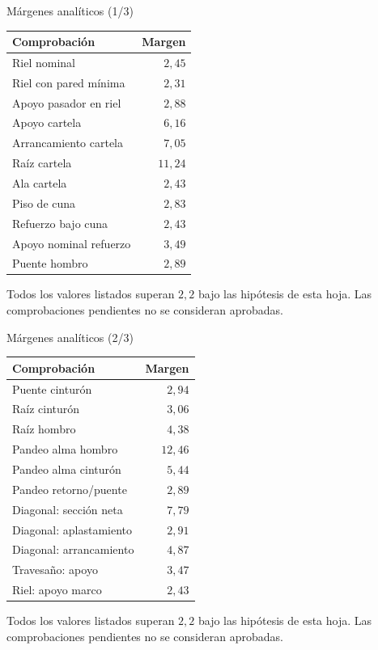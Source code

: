 \documentclass[10pt,aspectratio=169]{beamer}
\newcommand{\mcref}{Guía de diseño}
\begin{document}
\gdef\mcref{Mathcad: sección 24 / pág. 40-42}
\begin{frame}[t]{Márgenes analíticos (1/3)}
\small\begin{center}\begin{tabular}{lr}\toprule Comprobación & Margen\\\midrule Riel nominal & $2{,}45$\\
Riel con pared mínima & $2{,}31$\\
Apoyo pasador en riel & $2{,}88$\\
Apoyo cartela & $6{,}16$\\
Arrancamiento cartela & $7{,}05$\\
Raíz cartela & $11{,}24$\\
Ala cartela & $2{,}43$\\
Piso de cuna & $2{,}83$\\
Refuerzo bajo cuna & $2{,}43$\\
Apoyo nominal refuerzo & $3{,}49$\\
Puente hombro & $2{,}89$\\\bottomrule\end{tabular}\end{center} Todos los valores listados superan $2{,}2$ bajo las hipótesis de esta hoja. Las comprobaciones pendientes no se consideran aprobadas.
\end{frame}

\gdef\mcref{Mathcad: sección 24 / pág. 40-42}
\begin{frame}[t]{Márgenes analíticos (2/3)}
\small\begin{center}\begin{tabular}{lr}\toprule Comprobación & Margen\\\midrule Puente cinturón & $2{,}94$\\
Raíz cinturón & $3{,}06$\\
Raíz hombro & $4{,}38$\\
Pandeo alma hombro & $12{,}46$\\
Pandeo alma cinturón & $5{,}44$\\
Pandeo retorno/puente & $2{,}89$\\
Diagonal: sección neta & $7{,}79$\\
Diagonal: aplastamiento & $2{,}91$\\
Diagonal: arrancamiento & $4{,}87$\\
Travesaño: apoyo & $3{,}47$\\
Riel: apoyo marco & $2{,}43$\\\bottomrule\end{tabular}\end{center} Todos los valores listados superan $2{,}2$ bajo las hipótesis de esta hoja. Las comprobaciones pendientes no se consideran aprobadas.
\end{frame}
\end{document}
